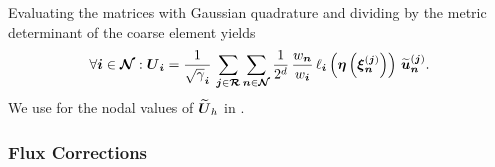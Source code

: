 Evaluating the matrices with Gaussian quadrature
and dividing by the metric determinant of the coarse element yields
\begin{equation}
  \forall\boldsymbol{i}\in\boldsymbol{\mathcal{N}}:\boldsymbol{U}_{\boldsymbol{i}}
  =\frac{1}{\sqrt{\gamma}_{\boldsymbol{i}}}\,
  \sum\limits_{\boldsymbol{j}\in\boldsymbol{\mathcal{R}}}
  \sum\limits_{\boldsymbol{n}\in\boldsymbol{\mathcal{N}}}
  \frac{1}{2^{d}}\,\frac{w_{\boldsymbol{n}}}{w_{\boldsymbol{i}}}\,
  \ell_{\boldsymbol{i}}\left(\boldsymbol{\eta}\left(\boldsymbol{\xi}_{\boldsymbol{n}}^{\left(\boldsymbol{j}\right)}\right)\right)\,
  \widetilde{\boldsymbol{u}}_{\boldsymbol{n}}^{\left(\boldsymbol{j}\right)}.
  \label{eq.crseNodal}
\end{equation}
We use  for the nodal values of $\widetilde{\boldsymbol{U}}_{h}$
in .

\subsubsection{Flux Corrections}

